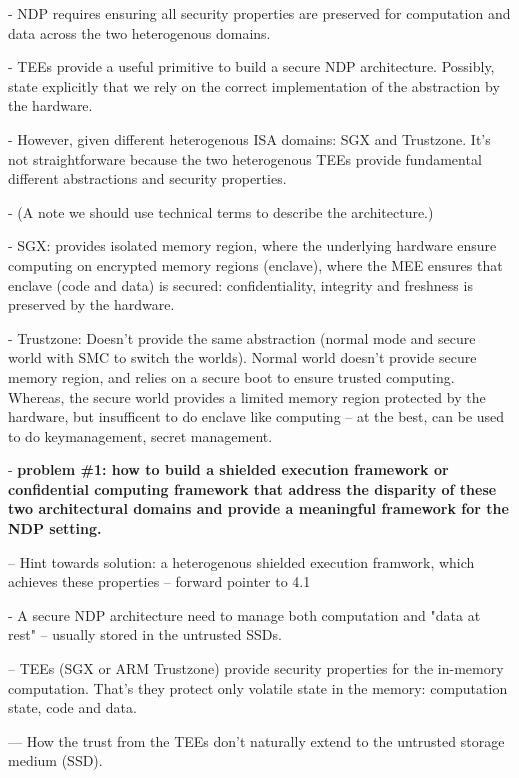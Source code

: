 


- NDP requires ensuring all security properties are preserved for computation and data across the two heterogenous domains.


- TEEs provide a useful primitive to build a secure NDP architecture. Possibly, state explicitly that we rely on the correct implementation of the abstraction by the hardware.

- However, given different heterogenous ISA domains: SGX and Trustzone. It's not straightforware because the two heterogenous TEEs provide fundamental different abstractions and security properties. 

- (A note we should use technical terms to describe the architecture.)
 
- SGX: provides isolated memory region, where the underlying hardware ensure computing on encrypted memory regions (enclave), where the MEE ensures that enclave (code and data) is secured: confidentiality, integrity and freshness is preserved by the hardware.

- Trustzone: Doesn't provide the same abstraction (normal mode and secure world  with SMC to switch the worlds). Normal world doesn't provide secure memory region, and relies on a secure boot to ensure trusted computing. Whereas, the secure world provides a limited memory region protected by the hardware, but insufficent to do enclave like computing -- at the best, can be used to do keymanagement, secret management.


- {\bf problem \#1: how to build a shielded execution framework or confidential computing framework that address the disparity of these two architectural domains and provide a meaningful framework for the NDP setting. }


-- Hint towards solution: a heterogenous shielded execution framwork, which achieves these properties -- forward pointer to 4.1




- A secure NDP architecture need to manage both computation and "data at rest" -- usually stored in the untrusted SSDs.


-- TEEs (SGX or ARM Trustzone) provide security properties for the in-memory computation. That's they protect only volatile state in the memory: computation state, code and data.

--- How the trust from the TEEs don't naturally extend to the untrusted storage medium (SSD). 

